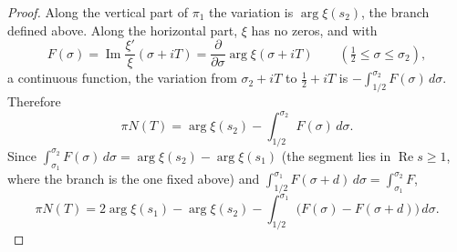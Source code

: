 \documentclass[11pt,reqno]{amsart}
\numberwithin{equation}{section}
\theoremstyle{definition}
\theoremstyle{remark}
\newcommand{\Rp}{\operatorname{Re}}
\newcommand{\Ip}{\operatorname{Im}}
\begin{document}
\begin{proof}
Along the vertical part of $\pi_1$ the variation is $\arg\xi(s_2)$, the branch defined above. Along the horizontal part, $\xi$ has no zeros, and with
\begin{equation}
F(\sigma)=\Ip\frac{\xi'}\xi(\sigma+iT)=\frac{\partial}{\partial\sigma}\arg\xi(\sigma+iT)\qquad(\tfrac12\le\sigma\le\sigma_2),
\label{eq:F_def}
\end{equation}
a continuous function, the variation from $\sigma_2+iT$ to $\frac12+iT$ is $-\int_{1/2}^{\sigma_2}F(\sigma)\,d\sigma$. Therefore
\begin{equation}
\pi N(T)=\arg\xi(s_2)-\int_{1/2}^{\sigma_2}F(\sigma)\,d\sigma .
\label{eq:argprinciple}
\end{equation}
Since $\int_{\sigma_1}^{\sigma_2}F(\sigma)\,d\sigma=\arg\xi(s_2)-\arg\xi(s_1)$ (the segment lies in $\Rp s\ge1$, where the branch is the one fixed above) and $\int_{1/2}^{\sigma_1}F(\sigma+d)\,d\sigma=\int_{\sigma_1}^{\sigma_2}F$,
\begin{equation}
\pi N(T)=2\arg\xi(s_1)-\arg\xi(s_2)-\int_{1/2}^{\sigma_1}\bigl(F(\sigma)-F(\sigma+d)\bigr)\,d\sigma .
\label{eq:turing_split}
\end{equation}


\end{proof}
\end{document}
